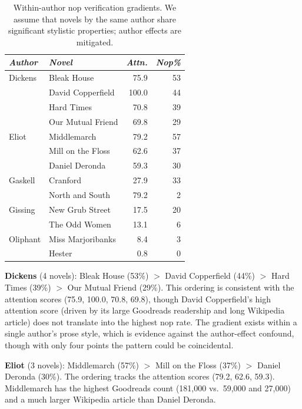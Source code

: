 \begin{table}[ht]
\centering
\small
\caption{Within-author nop verification gradients.  We assume that novels by the
same author share significant stylistic properties; author effects are mitigated.}
\label{tab:within_author}
\begin{tabularx}{\textwidth}{l|X|r|r}
\toprule
\textit{Author} & \textit{Novel} & \textit{Attn.} & \textit{Nop\%} \\
\midrule
Dickens  & Bleak House        & 75.9 & 53 \\
         & David Copperfield  & 100.0 & 44 \\
         & Hard Times         & 70.8 & 39 \\
         & Our Mutual Friend  & 69.8 & 29 \\
\addlinespace
Eliot    & Middlemarch        & 79.2 & 57 \\
         & Mill on the Floss  & 62.6 & 37 \\
         & Daniel Deronda     & 59.3 & 30 \\
\addlinespace
Gaskell  & Cranford           & 27.9 & 33 \\
         & North and South    & 79.2 &  2 \\
\addlinespace
Gissing  & New Grub Street    & 17.5 & 20 \\
         & The Odd Women      & 13.1 &  6 \\
\addlinespace
Oliphant & Miss Marjoribanks  &  8.4 &  3 \\
         & Hester             &  0.8 &  0 \\
\bottomrule
\end{tabularx}
\end{table}

\textbf{Dickens} (4 novels): Bleak House (53\%) $>$ David Copperfield
(44\%) $>$ Hard Times (39\%) $>$ Our Mutual Friend (29\%).  This
ordering is consistent with the attention scores (75.9, 100.0, 70.8,
69.8), though David Copperfield's high attention score (driven by its
large Goodreads readership and long Wikipedia article) does not
translate into the highest nop rate.  The gradient exists within a
single author's prose style, which is evidence against the
author-effect confound, though with only four points the pattern could
be coincidental.

\textbf{Eliot} (3 novels): Middlemarch (57\%) $>$ Mill on the Floss
(37\%) $>$ Daniel Deronda (30\%).  The ordering tracks the attention
scores (79.2, 62.6, 59.3).  Middlemarch has the highest Goodreads count
(181,000 vs.\ 59,000 and 27,000) and a much larger Wikipedia article
than Daniel Deronda.

